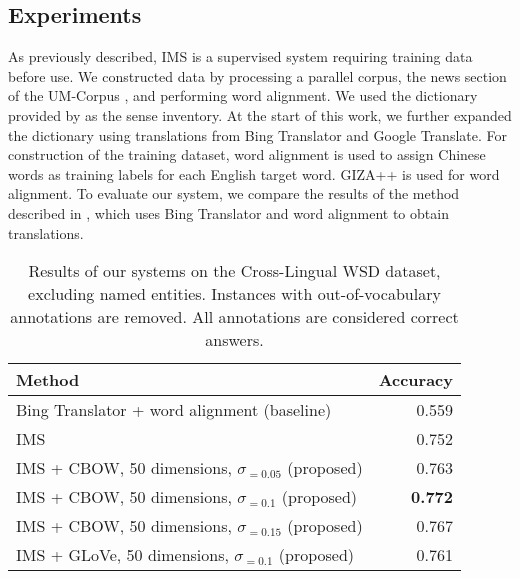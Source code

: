 {\subsection{Experiments}

As previously described, IMS is a supervised system requiring training data before use. We constructed data by processing a parallel corpus, the news section of the UM-Corpus \cite{tian2014corpus}, and performing word alignment. We used the dictionary provided by \cite{tao2014} as the sense inventory. At the start of this work, we further expanded the dictionary using translations from Bing Translator and Google Translate. For construction of the training dataset, word alignment is used to assign Chinese words as training labels for each English target word. GIZA++ \cite {och03} is used for word alignment. To evaluate our system, we compare the results of the method described in \cite{tao2014}, which uses Bing Translator and word alignment to obtain translations.

\begin{table}[ht]
	\caption{Results of our systems on the Cross-Lingual WSD dataset, excluding named entities. Instances with out-of-vocabulary annotations are removed. All annotations are considered correct answers.}
	\label{table:CLWSD-test-results}
	\begin{center}

			\begin{tabular}{| p{9cm}| r| }
				\hline
				Method & Accuracy \\
				\hline
				Bing Translator + 
                word alignment (baseline) & 0.559  \\
				\hline
				IMS & 0.752  \\
				\hline
                IMS + CBOW, 50 dimensions, $\sigma _{=0.05}$ (proposed) &  0.763  \\
				\hline
				IMS + CBOW, 50 dimensions, $\sigma _{=0.1}$ (proposed) & {\bf 0.772}  \\                                
                \hline
                IMS + CBOW, 50 dimensions, $\sigma _{=0.15}$ (proposed) & 0.767  \\
                \hline
                IMS + GLoVe, 50 dimensions, $\sigma _{=0.1}$ (proposed) & 0.761  \\


				\hline
			\end{tabular}

	\end{center}
\end{table}

}
